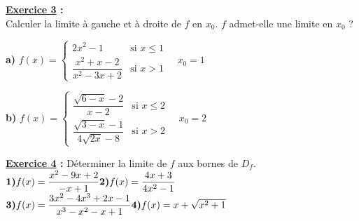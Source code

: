 \documentclass[12pt,a4paper]{article}
\begin{document}
\begin{multicols}{2}
\setlength{\columnseprule}{0.1mm} %
\textbf{\underline{Exercice 3} :} \\
Calculer la limite à gauche et à droite de \( f \) en \( x_0 \). \( f \) admet-elle une limite en \( x_0 \) ?

\textbf{a)} \( f(x) = 
\begin{cases}
2x^2 - 1 & \text{si } x \leq 1 \\
\dfrac{x^2 + x - 2}{x^2 - 3x + 2} & \text{si } x > 1
\end{cases} 
\quad x_0 = 1 \)

\textbf{b)} \( f(x) = 
\begin{cases}
\dfrac{\sqrt{6 - x} - 2}{x - 2} & \text{si } x \leq 2 \\
\dfrac{\sqrt{3 - x} - 1}{4\sqrt{2x} - 8} & \text{si } x > 2
\end{cases} 
\quad x_0 = 2 \)

\textbf{\underline{Exercice 4} :} Déterminer la limite de \( f \) aux bornes de \( D_f \).
   \(\textbf{1)} f(x)=\dfrac{x^2 - 9x + 2}{-x + 1}\quad\\ \textbf{2)} f(x) = \dfrac{4x + 3}{4x^2 - 1}\)
  \(\textbf{3)} f(x) = \dfrac{3x^2 - 4x^3 + 2x - 1}{x^3 - x^2 - x + 1}\quad \\\textbf{4)} f(x) = x + \sqrt{x^2 + 1}\)


\end{multicols}
\end{document}
